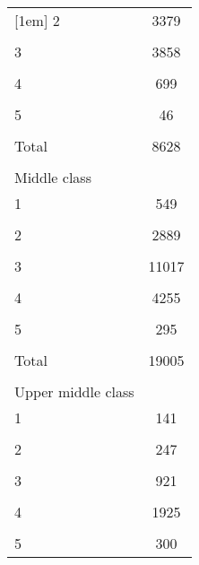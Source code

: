 {\begin{tabular}{l*{1}{c}}
[1em]
2           &        3379         \\
            &                     \\
[1em]
3           &        3858         \\
            &                     \\
[1em]
4           &         699         \\
            &                     \\
[1em]
5           &          46         \\
            &                     \\
[1em]
Total       &        8628         \\
            &                     \\
\hline
Middle class&                     \\
1           &         549         \\
            &                     \\
[1em]
2           &        2889         \\
            &                     \\
[1em]
3           &       11017         \\
            &                     \\
[1em]
4           &        4255         \\
            &                     \\
[1em]
5           &         295         \\
            &                     \\
[1em]
Total       &       19005         \\
            &                     \\
\hline
Upper middle class&                     \\
1           &         141         \\
            &                     \\
[1em]
2           &         247         \\
            &                     \\
[1em]
3           &         921         \\
            &                     \\
[1em]
4           &        1925         \\
            &                     \\
[1em]
5           &         300         \\

\end{tabular}}
